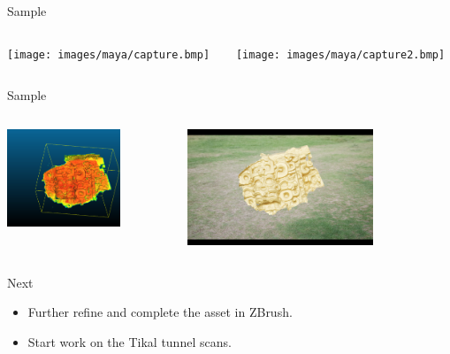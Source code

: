 \begin{frame}{Sample}
    \begin{columns}
       \begin{column}{0.5\textwidth}
        \texttt{[image: images/maya/capture.bmp]}
       \end{column}
       \begin{column}{0.5\textwidth}
        \texttt{[image: images/maya/capture2.bmp]}
       \end{column}
   \end{columns}
\end{frame}

\begin{frame}{Sample}
    \begin{columns}
       \begin{column}{0.5\textwidth}
        \includegraphics[height=0.7\textheight,width=0.7\textwidth,keepaspectratio]{images/maya/capture4.bmp}
       \end{column}
       \begin{column}{0.5\textwidth}
        \includegraphics[height=0.7\textheight,width=0.7\textwidth,keepaspectratio]{images/maya/render.png}
       \end{column}
   \end{columns}
\end{frame}

\begin{frame}{Next}
    \begin{itemize}
       \item Further refine and complete the asset in ZBrush.
       \item Start work on the Tikal tunnel scans.
   \end{itemize}    
\end{frame}
